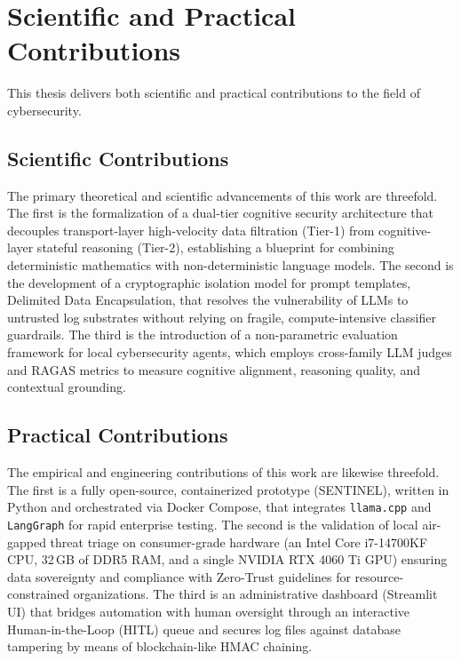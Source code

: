 \section{Scientific and Practical Contributions}
This thesis delivers both scientific and practical contributions to the field of cybersecurity.

\subsection{Scientific Contributions}
The primary theoretical and scientific advancements of this work are threefold. The first is the formalization of a dual-tier cognitive security architecture that decouples transport-layer high-velocity data filtration (Tier-1) from cognitive-layer stateful reasoning (Tier-2), establishing a blueprint for combining deterministic mathematics with non-deterministic language models. The second is the development of a cryptographic isolation model for prompt templates, Delimited Data Encapsulation, that resolves the vulnerability of LLMs to untrusted log substrates without relying on fragile, compute-intensive classifier guardrails. The third is the introduction of a non-parametric evaluation framework for local cybersecurity agents, which employs cross-family LLM judges and RAGAS metrics to measure cognitive alignment, reasoning quality, and contextual grounding.

\subsection{Practical Contributions}
The empirical and engineering contributions of this work are likewise threefold. The first is a fully open-source, containerized prototype (SENTINEL), written in Python and orchestrated via Docker Compose, that integrates \texttt{llama.cpp} and \texttt{LangGraph} for rapid enterprise testing. The second is the validation of local air-gapped threat triage on consumer-grade hardware (an Intel Core i7-14700KF CPU, 32\,GB of DDR5 RAM, and a single NVIDIA RTX 4060 Ti GPU) ensuring data sovereignty and compliance with Zero-Trust guidelines for resource-constrained organizations. The third is an administrative dashboard (Streamlit UI) that bridges automation with human oversight through an interactive Human-in-the-Loop (HITL) queue and secures log files against database tampering by means of blockchain-like HMAC chaining.

